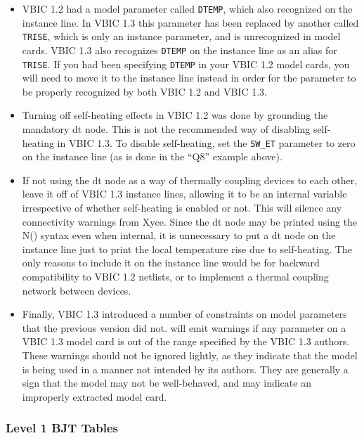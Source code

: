 \begin{itemize}
  \item VBIC 1.2 had a model parameter called \texttt{DTEMP}, which
    \Xyce{} also recognized on the instance line.  In VBIC 1.3 this
    parameter has been replaced by another called \texttt{TRISE},
    which is only an instance parameter, and is unrecognized in model
    cards.  VBIC 1.3 also recognizes \texttt{DTEMP} on the instance
    line as an alias for \texttt{TRISE}.  If you had been specifying
    \texttt{DTEMP} in your VBIC 1.2 model cards, you will need to move it
    to the instance line instead in order for the parameter to be
    properly recognized by both VBIC 1.2 and VBIC 1.3.
  \item Turning off self-heating effects in VBIC 1.2 was done by
    grounding the mandatory dt node.  This is not the recommended way
    of disabling self-heating in VBIC 1.3.  To disable self-heating,
    set the \texttt{SW\_ET} parameter to zero on the instance line (as
    is done in the ``Q8'' example above).
  \item If not using the dt node as a way of thermally coupling
    devices to each other, leave it off of VBIC 1.3 instance lines,
    allowing it to be an internal variable irrespective of whether
    self-heating is enabled or not.  This will silence any connectivity
    warnings from Xyce.  Since the dt node may be printed using the
    N() syntax even when internal, it is unnecessary to put a dt node
    on the instance line just to print the local temperature rise due
    to self-heating.  The only reasons to include it on the instance
    line would be for backward compatibility to VBIC 1.2 netlists, or
    to implement a thermal coupling network between devices.
  \item Finally, VBIC 1.3 introduced a number of constraints on model
    parameters that the previous version did not.  \Xyce{} will emit
    warnings if any parameter on a VBIC 1.3 model card is out of the
    range specified by the VBIC 1.3 authors.  These warnings should
    not be ignored lightly, as they indicate that the model is being
    used in a manner not intended by its authors.  They are generally
    a sign that the model may not be well-behaved, and may indicate an
    improperly extracted model card.

\end{itemize}

\subsubsection{Level 1 BJT Tables}



